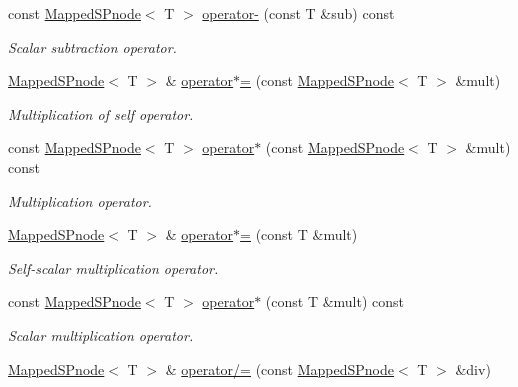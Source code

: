 \begin{DoxyCompactItemize}
const \hyperlink{classsubpavings_1_1MappedSPnode}{\-Mapped\-S\-Pnode}$<$ \-T $>$ \hyperlink{classsubpavings_1_1MappedSPnode_ad4bb0c01c69521b16c62a90a6e540e8f}{operator-\/} (const \-T \&sub) const 
\begin{DoxyCompactList}\small\item\em \-Scalar subtraction operator. \end{DoxyCompactList}\item 
\hyperlink{classsubpavings_1_1MappedSPnode}{\-Mapped\-S\-Pnode}$<$ \-T $>$ \& \hyperlink{classsubpavings_1_1MappedSPnode_aa5949967da59e064734929aaf190fc15}{operator$\ast$=} (const \hyperlink{classsubpavings_1_1MappedSPnode}{\-Mapped\-S\-Pnode}$<$ \-T $>$ \&mult)
\begin{DoxyCompactList}\small\item\em \-Multiplication of self operator. \end{DoxyCompactList}\item 
const \hyperlink{classsubpavings_1_1MappedSPnode}{\-Mapped\-S\-Pnode}$<$ \-T $>$ \hyperlink{classsubpavings_1_1MappedSPnode_af329c66306f63fb572c92c582640633e}{operator$\ast$} (const \hyperlink{classsubpavings_1_1MappedSPnode}{\-Mapped\-S\-Pnode}$<$ \-T $>$ \&mult) const 
\begin{DoxyCompactList}\small\item\em \-Multiplication operator. \end{DoxyCompactList}\item 
\hyperlink{classsubpavings_1_1MappedSPnode}{\-Mapped\-S\-Pnode}$<$ \-T $>$ \& \hyperlink{classsubpavings_1_1MappedSPnode_a6c028eece36691537a2c824b39d0fb00}{operator$\ast$=} (const \-T \&mult)
\begin{DoxyCompactList}\small\item\em \-Self-\/scalar multiplication operator. \end{DoxyCompactList}\item 
const \hyperlink{classsubpavings_1_1MappedSPnode}{\-Mapped\-S\-Pnode}$<$ \-T $>$ \hyperlink{classsubpavings_1_1MappedSPnode_a855f75cf76d1ee0235c7aaab29b048f3}{operator$\ast$} (const \-T \&mult) const 
\begin{DoxyCompactList}\small\item\em \-Scalar multiplication operator. \end{DoxyCompactList}\item 
\hyperlink{classsubpavings_1_1MappedSPnode}{\-Mapped\-S\-Pnode}$<$ \-T $>$ \& \hyperlink{classsubpavings_1_1MappedSPnode_a793f3f3b66690ef99c8a737850f7c291}{operator/=} (const \hyperlink{classsubpavings_1_1MappedSPnode}{\-Mapped\-S\-Pnode}$<$ \-T $>$ \&div)

\end{DoxyCompactItemize}
